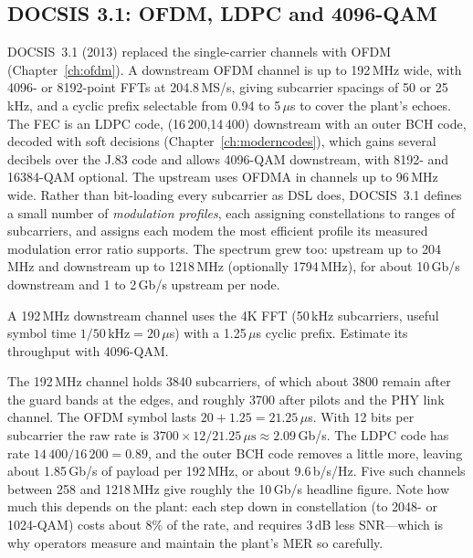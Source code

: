 

\subsection{DOCSIS 3.1: OFDM, LDPC and 4096-QAM}

DOCSIS~3.1 (2013) replaced the single-carrier channels with OFDM (Chapter~\ref{ch:ofdm}). A downstream
OFDM channel is up to 192\,MHz wide, with 4096- or 8192-point FFTs at 204.8\,MS/s, giving subcarrier
spacings of 50 or 25\,kHz, and a cyclic prefix selectable from 0.94 to 5\,$\mu$s to cover the plant's
echoes. The FEC is an LDPC code, (16\,200,14\,400) downstream with an outer BCH code, decoded with soft
decisions (Chapter~\ref{ch:moderncodes}), which gains several decibels over the J.83 code and allows
4096-QAM downstream, with 8192- and 16384-QAM optional. The upstream uses OFDMA in channels up to
96\,MHz wide. Rather than bit-loading every subcarrier as DSL does, DOCSIS~3.1 defines a small number
of \emph{modulation profiles}, each assigning constellations to ranges of subcarriers, and assigns each
modem the most efficient profile its measured modulation error ratio supports. The spectrum grew too:
upstream up to 204\,MHz and downstream up to 1218\,MHz (optionally 1794\,MHz), for about 10\,Gb/s
downstream and 1 to 2\,Gb/s upstream per node.



\begin{worked}
A 192\,MHz downstream channel uses the 4K FFT (50\,kHz subcarriers, useful symbol time
$1/50\,\text{kHz}=20\,\mu$s) with a 1.25\,$\mu$s cyclic prefix. Estimate its throughput with 4096-QAM.

The 192\,MHz channel holds 3840 subcarriers, of which about 3800 remain after the guard bands at
the edges, and roughly 3700 after pilots and the PHY link channel. The OFDM symbol lasts
$20+1.25=21.25\,\mu$s. With 12 bits per subcarrier the raw rate is
$3700\times12/21.25\,\mu\text{s}\approx2.09$\,Gb/s. The LDPC code has rate $14\,400/16\,200=0.89$, and
the outer BCH code removes a little more, leaving about 1.85\,Gb/s of payload per 192\,MHz, or about
9.6\,b/s/Hz. Five such channels between 258 and 1218\,MHz give roughly the 10\,Gb/s headline figure.
Note how much this depends on the plant: each step down in constellation (to 2048- or 1024-QAM) costs
about 8\% of the rate, and requires 3\,dB less SNR---which is why operators measure and maintain
the plant's MER so carefully.
\end{worked}

